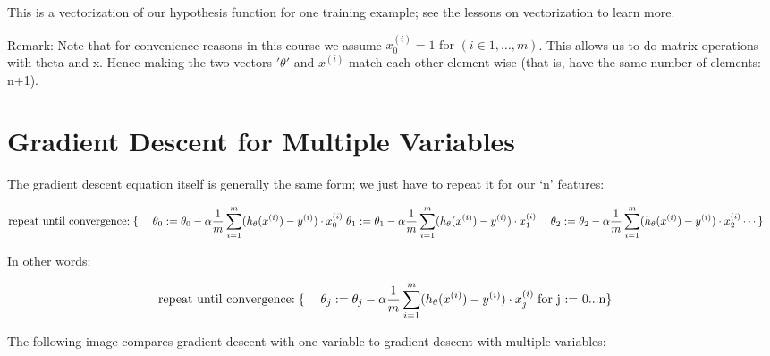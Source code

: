 \documentclass[
]{book}
\begin{document}
This is a vectorization of our hypothesis function for one training example; see the lessons on vectorization to learn more.

Remark: Note that for convenience reasons in this course we assume \(x_{0}^{(i)} =1 \text{ for } (i\in { 1,\dots, m } )\). This allows us to do matrix operations with theta and x. Hence making the two vectors \('\theta'\) and \(x^{(i)}\) match each other element-wise (that is, have the same number of elements: n+1).

\hypertarget{gradient-descent-for-multiple-variables}{%
\section{Gradient Descent for Multiple Variables}\label{gradient-descent-for-multiple-variables}}

The gradient descent equation itself is generally the same form; we just have to repeat it for our `n' features:

\begin{align*} & \text{repeat until convergence:} \; \lbrace \newline \; & \theta_0 := \theta_0 - \alpha \frac{1}{m} \sum\limits_{i=1}^{m} (h_\theta(x^{(i)}) - y^{(i)}) \cdot x_0^{(i)}\newline \; & \theta_1 := \theta_1 - \alpha \frac{1}{m} \sum\limits_{i=1}^{m} (h_\theta(x^{(i)}) - y^{(i)}) \cdot x_1^{(i)} \newline \; & \theta_2 := \theta_2 - \alpha \frac{1}{m} \sum\limits_{i=1}^{m} (h_\theta(x^{(i)}) - y^{(i)}) \cdot x_2^{(i)} \newline & \cdots \newline \rbrace \end{align*}

In other words:

\begin{align*}& \text{repeat until convergence:} \; \lbrace \newline \; & \theta_j := \theta_j - \alpha \frac{1}{m} \sum\limits_{i=1}^{m} (h_\theta(x^{(i)}) - y^{(i)}) \cdot x_j^{(i)} \; & \text{for j := 0...n}\newline \rbrace\end{align*}

The following image compares gradient descent with one variable to gradient descent with multiple variables:
\end{document}
